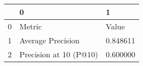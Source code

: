 \begin{tabular}{lll}
\toprule
 & 0 & 1 \\
\midrule
0 & Metric & Value \\
1 & Average Precision & 0.848611 \\
2 & Precision at 10 (P@10) & 0.600000 \\
\bottomrule
\end{tabular}
